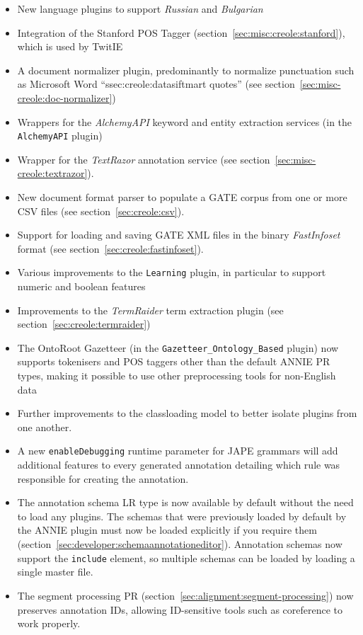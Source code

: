 \begin{itemize}
\item New language plugins to support \emph{Russian} and \emph{Bulgarian}
\item Integration of the Stanford POS Tagger
  (section~\ref{sec:misc:creole:stanford}), which is used by TwitIE
\item A document normalizer plugin, predominantly to normalize punctuation such
  as Microsoft Word ``ssec:creole:datasiftmart quotes'' (see
  section~\ref{sec:misc-creole:doc-normalizer})
\item Wrappers for the \emph{AlchemyAPI} keyword and entity extraction services
  (in the \verb!AlchemyAPI! plugin)
\item Wrapper for the \emph{TextRazor} annotation service (see
  section~\ref{sec:misc-creole:textrazor}).
\item New document format parser to populate a GATE corpus from one or more CSV
  files (see section~\ref{sec:creole:csv}).
\item Support for loading and saving GATE XML files in the binary
  \emph{FastInfoset} format (see section~\ref{sec:creole:fastinfoset}).
\item Various improvements to the \verb!Learning! plugin, in particular to
  support numeric and boolean features
\item Improvements to the \emph{TermRaider} term extraction plugin (see
  section~\ref{sec:creole:termraider})
\item The OntoRoot Gazetteer (in the \verb!Gazetteer_Ontology_Based! plugin)
  now supports tokenisers and POS taggers other than the default ANNIE PR
  types, making it possible to use other preprocessing tools for non-English
  data
\item Further improvements to the classloading model to better isolate plugins
  from one another.
\item A new \verb!enableDebugging! runtime parameter for JAPE grammars will add
  additional features to every generated annotation detailing which rule was
  responsible for creating the annotation.
\end{itemize}


\begin{itemize}
\item The annotation schema LR type is now available by default without the
  need to load any plugins.  The schemas that were previously loaded by default
  by the ANNIE plugin must now be loaded explicitly if you require them
  (section~\ref{sec:developer:schemaannotationeditor}).  Annotation schemas now
  support the \verb!include! element, so multiple schemas can be loaded by
  loading a single master file.
\item The segment processing PR
  (section~\ref{sec:alignment:segment-processing}) now preserves annotation
  IDs, allowing ID-sensitive tools such as coreference to work properly.
\end{itemize}

